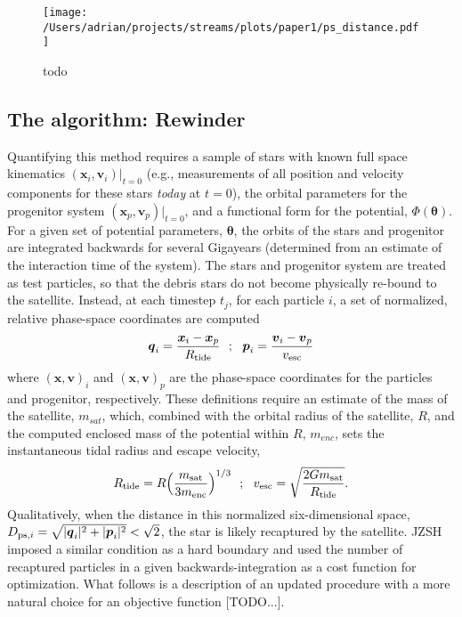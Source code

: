 \documentclass[preprint]{aastex}
\newcommand{\bs}{\boldsymbol}
\begin{document}
\begin{figure}[h]
\begin{center}
\texttt{[image: /Users/adrian/projects/streams/plots/paper1/ps\_distance.pdf]}
\caption{ todo }\label{fig:ps_distance}
\end{center}
\end{figure}

\subsection{The algorithm: Rewinder}
Quantifying this method requires a sample of stars with known full
space kinematics $(\bs{x}_{i}, \bs{v}_{i})|_{t=0}$ (e.g., measurements of all position and velocity components for these stars \emph{today} at $t=0$), the orbital parameters
for the progenitor system $(\bs{x}_p, \bs{v}_p)|_{t=0}$, and a
functional form for the potential, $\Phi({\boldsymbol\theta})$. For a
given set of potential parameters, $\boldsymbol\theta$, the orbits of the stars and
progenitor are integrated backwards for several Gigayears (determined from an
estimate of the interaction time of the system). The stars and
progenitor system are treated as test particles, so that the debris
stars do not become physically re-bound to the satellite. Instead, at each
timestep $t_j$, for each particle $i$, a set of normalized, relative
phase-space coordinates are
computed 
\begin{equation}
  \bs{q}_{i} = \frac{\bs{x}_{i} -
    \bs{x}_{p}}{R_{\rm tide}}\,\,\,\,;\,\,\,\,\bs{p}_{i} = \frac{\bs{v}_{i} -
    \bs{v}_{p}}{v_{\rm esc}}
\end{equation}
where $(\bs{x},\bs{v})_{i}$ and $(\bs{x},\bs{v})_{p}$ are the phase-space coordinates for the particles and progenitor, respectively. These definitions require an estimate of the mass of the
satellite, $m_{sat}$, which, combined with the orbital radius of the satellite, $R$, and the computed enclosed mass
of the potential within $R$, $m_{enc}$, sets the instantaneous tidal radius and
escape velocity,
\begin{equation}
  R_{\rm tide}=R\Big(\frac{m_{\rm sat}}{3m_{\rm enc}}\Big)^{1/3}\,\,\,\,;\,\,\,\,
  v_{\rm esc}=\sqrt{\frac{2Gm_{\rm sat}}{R_{\rm tide}}}.
\end{equation}
Qualitatively, when the distance in this normalized six-dimensional space,
$D_{{\rm ps},i}=\sqrt{|\bs{q}_{i}|^2+|\bs{p}_{i}|^2} < \sqrt{2}$, the star is
likely recaptured by the satellite. JZSH imposed a similar condition as a hard boundary and used the number of recaptured particles in a given backwards-integration as a cost function for optimization. What follows is a description of an updated procedure with a more natural choice for an objective function [TODO...].
\end{document}
